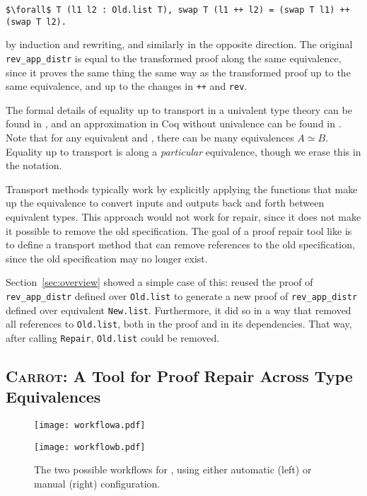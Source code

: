 \begin{lstlisting}
$\forall$ T (l1 l2 : Old.list T), swap T (l1 ++ l2) = (swap T l1) ++ (swap T l2).
\end{lstlisting}
by induction and rewriting, and similarly in the opposite direction.
The original \lstinline{rev_app_distr} is equal to the transformed proof along the same equivalence,
since it proves the same thing the same way as the transformed proof up to the same equivalence, and up to the changes in \lstinline{++}
and \lstinline{rev}.

The formal details of equality up to transport in a univalent type theory can be found in \citet{univalent2013homotopy}, and an approximation in Coq without univalence can be found in \citet{tabareau2017equivalences}.
Note that for any equivalent \A and \B, there can be many equivalences $A \simeq B$.
Equality up to transport is along a \textit{particular} equivalence, though we erase this in the notation.

Transport methods typically work by explicitly applying the functions that make up the equivalence to convert
inputs and outputs back and forth between equivalent types.
This approach would not work for repair, since it does not make it possible to remove the old specification.
The goal of a proof repair tool like \toolname is to define a transport method that
can remove references to the old specification, %
since the old specification may no longer exist.

Section~\ref{sec:overview} showed a simple case of this: \toolname
reused the proof of \lstinline{rev_app_distr} defined over \lstinline{Old.list}
to generate a new proof of \lstinline{rev_app_distr} defined over equivalent \lstinline{New.list}.
Furthermore, it did so in a way that removed all references to \lstinline{Old.list}, both in the proof
and in its dependencies.
That way, after calling \lstinline{Repair}, \lstinline{Old.list} could be removed.

\subsection{\textsc{Carrot}: A Tool for Proof Repair Across Type Equivalences}
\label{sec:time}

\begin{figure*}
\begin{minipage}{0.52\textwidth}
\texttt{[image: workflowa.pdf]}
\end{minipage}
\hfill
\begin{minipage}{0.45\textwidth}
\texttt{[image: workflowb.pdf]}
\vspace{0.97cm}
\end{minipage}
\vspace{-0.4cm}
\caption{The two possible workflows for \toolname, using either automatic (left) or manual (right) configuration.}
\label{fig:system}
\end{figure*}

